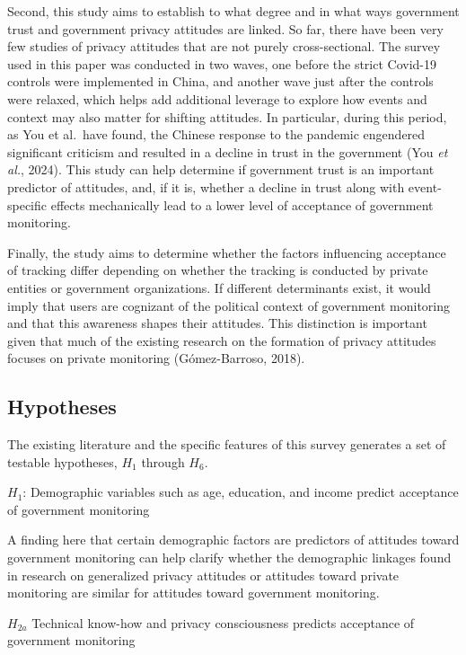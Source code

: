 \documentclass[
  letterpaper,
  DIV=11,
  numbers=noendperiod]{scrartcl}
\begin{document}
Second, this study aims to establish to what degree and in what ways
government trust and government privacy attitudes are linked. So far,
there have been very few studies of privacy attitudes that are not
purely cross-sectional. The survey used in this paper was conducted in
two waves, one before the strict Covid-19 controls were implemented in
China, and another wave just after the controls were relaxed, which
helps add additional leverage to explore how events and context may also
matter for shifting attitudes. In particular, during this period, as You
et al.~have found, the Chinese response to the pandemic engendered
significant criticism and resulted in a decline in trust in the
government (You \emph{et al.}, 2024). This study can help determine if
government trust is an important predictor of attitudes, and, if it is,
whether a decline in trust along with event-specific effects
mechanically lead to a lower level of acceptance of government
monitoring.

Finally, the study aims to determine whether the factors influencing
acceptance of tracking differ depending on whether the tracking is
conducted by private entities or government organizations. If different
determinants exist, it would imply that users are cognizant of the
political context of government monitoring and that this awareness
shapes their attitudes. This distinction is important given that much of
the existing research on the formation of privacy attitudes focuses on
private monitoring (Gómez-Barroso, 2018).

\subsection{Hypotheses}\label{hypotheses}

The existing literature and the specific features of this survey
generates a set of testable hypotheses, \(H_1\) through \(H_6\).

\(H_1\): Demographic variables such as age, education, and income
predict acceptance of government monitoring

A finding here that certain demographic factors are predictors of
attitudes toward government monitoring can help clarify whether the
demographic linkages found in research on generalized privacy attitudes
or attitudes toward private monitoring are similar for attitudes toward
government monitoring.

\(H_{2a}\) Technical know-how and privacy consciousness predicts
acceptance of government monitoring
\end{document}
